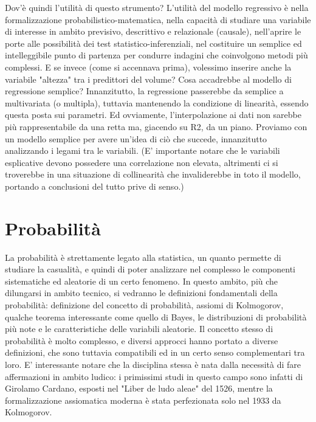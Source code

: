 \documentclass[a4paper]{article}
\begin{document}
Dov'\`{e} quindi l'utilit\`{a} di questo strumento? L'utilit\`{a} del modello regressivo \`{e} nella formalizzazione probabilistico-matematica, nella capacit\`{a} di studiare una variabile di interesse in ambito previsivo, descrittivo e relazionale (causale), nell'aprire le porte alle possibilit\`{a} dei test statistico-inferenziali, nel costituire un semplice ed intelleggibile punto di partenza per condurre indagini che coinvolgono metodi più complessi.
E se invece (come si accennava prima), volessimo inserire anche la variabile "altezza" tra i predittori del volume? Cosa accadrebbe al modello di regressione semplice?
Innanzitutto, la regressione passerebbe da semplice a multivariata (o multipla), tuttavia mantenendo la condizione di linearit\`{a}, essendo questa posta sui parametri. Ed ovviamente, l'interpolazione ai dati non sarebbe più rappresentabile da una retta ma, giacendo su R2, da un piano.
Proviamo con un modello semplice per avere un'idea di ciò che succede, innanzitutto analizzando i legami tra le variabili. (E' importante notare che le variabili esplicative devono possedere una correlazione non elevata, altrimenti ci si troverebbe in una situazione di collinearit\`{a} che invaliderebbe in toto il modello, portando a conclusioni del tutto prive di senso.)



\section{Probabilit\`{a}}

La probabilit\`{a} \`{e} strettamente legato alla statistica, un quanto permette di studiare la casualit\`{a}, e quindi di poter analizzare nel complesso le componenti sistematiche ed aleatorie di un certo fenomeno. In questo ambito, più che dilungarsi in ambito tecnico, si vedranno le definizioni fondamentali della probabilit\`{a}: definizione del concetto di probabilit\`{a}, assiomi di Kolmogorov, qualche teorema interessante come quello di Bayes, le distribuzioni di probabilit\`{a} più note e le caratteristiche delle variabili aleatorie.
Il concetto stesso di probabilit\`{a} \`{e} molto complesso, e diversi approcci hanno portato a diverse definizioni, che sono tuttavia compatibili ed in un certo senso complementari tra loro. E' interessante notare che la disciplina stessa \`{e} nata dalla necessit\`{a} di fare affermazioni in ambito ludico: i primissimi studi in questo campo sono infatti di Girolamo Cardano, esposti nel "Liber de ludo aleae" del 1526, mentre la formalizzazione assiomatica moderna \`{e} stata perfezionata solo nel 1933 da Kolmogorov.
\end{document}
